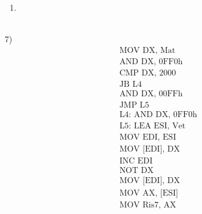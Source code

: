 \begin{enumerate}
\begin{equation*}
\begin{tikzpicture}[
				every node/.style={column sep=.5mm,row sep=1mm}]
				\draw[-,color=black,semithick] (m-2-2.south west) -- (m-2-9.south east);
			\end{tikzpicture}
		\end{equation*}
	\textsf{{\small L'operazione di \textbf{XOR}:}}
	\enlargethispage{42pt}
	\begin{itemize}
		\item \textsf{{\small se i due bit sono diversi il risultato è 1, altrimenti 0.}} \\
	\end{itemize}
	\textsf{{\small AX = \color{red}5E}} \\
	\item {} \\
	 \\
\end{enumerate}


\pagebreak

\textsf{\large{\color{red} 7) }} \\

\begin{align*}
	&\text{MOV DX, Mat} \\
	&\text{AND DX, 0FF0h} \\
	&\text{CMP DX, 2000} \\
	&\text{JB L4} \\
	&\text{AND DX, 00FFh} \\
	&\text{JMP L5} \\
	&\text{L4: AND DX, 0FF0h} \\
	&\text{L5: LEA ESI, Vet} \\
	&\text{MOV EDI, ESI} \\
	&\text{MOV [EDI], DX} \\
	&\text{INC EDI} \\
	&\text{NOT DX} \\
	&\text{MOV [EDI], DX} \\
	&\text{MOV AX, [ESI]} \\
	&\text{MOV Ris7, AX} \\
\end{align*}

